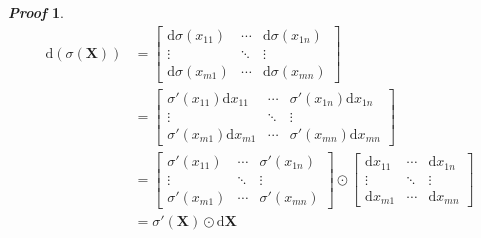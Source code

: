 \documentclass{article}
\newcommand{\Differential}{\ensuremath{\mathrm{d}}}
\newcommand{\MatrixSymbol}[1]{\ensuremath{{\boldsymbol{#1}}}}
\newcommand{\MatrixX}{\MatrixSymbol{X}}
\theoremstyle{nonumberplain}
\newtheorem{Proof}{\textit{\textbf{Proof}}}
\begin{document}
\begin{Proof}
    \begin{equation*}
        \begin{split}
            \Differential\left(\sigma(\MatrixX)\right)&=\begin{bmatrix}
                \Differential\sigma(x_{11})&\cdots&\Differential\sigma(x_{1n})\\
                \vdots&\ddots&\vdots\\
                \Differential\sigma(x_{m1})&\cdots&\Differential\sigma(x_{mn})
            \end{bmatrix}\\
            &=\begin{bmatrix}
                \sigma'(x_{11})\Differential x_{11}&\cdots&\sigma'(x_{1n})\Differential x_{1n}\\
                \vdots&\ddots&\vdots\\
                \sigma'(x_{m1})\Differential x_{m1}&\cdots&\sigma'(x_{mn})\Differential x_{mn}
            \end{bmatrix}\\
            &=\begin{bmatrix}
                \sigma'(x_{11})&\cdots&\sigma'(x_{1n})\\
                \vdots&\ddots&\vdots\\
                \sigma'(x_{m1})&\cdots&\sigma'(x_{mn})
            \end{bmatrix}\odot\begin{bmatrix}
                \Differential x_{11}&\cdots&\Differential x_{1n}\\
                \vdots&\ddots&\vdots\\
                \Differential x_{m1}&\cdots&\Differential x_{mn}
            \end{bmatrix}\\
            &=\sigma'(\MatrixX)\odot\Differential\MatrixX
        \end{split}
    \end{equation*}
\end{Proof}
\end{document}
